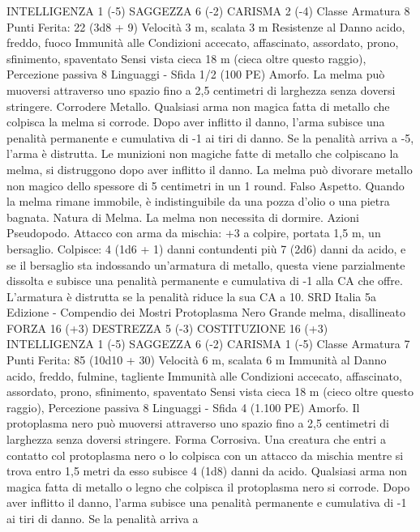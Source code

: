 \begin{multicols}{2}
INTELLIGENZA 1 (-5)
SAGGEZZA 6 (-2)
CARISMA 2 (-4)
Classe Armatura 8
\hspace*{0pt}\hfill{Punti Ferita}: 22 (3d8 + 9)
Velocità 3 m, scalata 3 m
Resistenze al Danno acido, freddo, fuoco
Immunità alle Condizioni accecato, affascinato, assordato,
prono, sfinimento, spaventato
Sensi vista cieca 18 m (cieca oltre questo raggio), Percezione
passiva 8
Linguaggi -
Sfida 1/2 (100 PE)
Amorfo. La melma può muoversi attraverso uno spazio fino a 2,5
centimetri di larghezza senza doversi stringere.
Corrodere Metallo. Qualsiasi arma non magica fatta di metallo che
colpisca la melma si corrode. Dopo aver inflitto il danno, l’arma
subisce una penalità permanente e cumulativa di -1 ai tiri di danno.
Se la penalità arriva a -5, l’arma è distrutta. Le munizioni non
magiche fatte di metallo che colpiscano la melma, si distruggono
dopo aver inflitto il danno.
La melma può divorare metallo non magico dello spessore di 5
centimetri in un 1 round.
Falso Aspetto. Quando la melma rimane immobile, è
indistinguibile da una pozza d’olio o una pietra bagnata.
Natura di Melma. La melma non necessita di dormire.
Azioni
Pseudopodo. Attacco con arma da mischia: +3 a colpire, portata
1,5 m, un bersaglio.
Colpisce: 4 (1d6 + 1) danni contundenti più 7 (2d6) danni da
acido, e se il bersaglio sta indossando un’armatura di metallo,
questa viene parzialmente dissolta e subisce una penalità
permanente e cumulativa di -1 alla CA che offre. L’armatura è
distrutta se la penalità riduce la sua CA a 10.
SRD Italia 5a Edizione - Compendio dei Mostri
Protoplasma Nero
Grande melma, disallineato
FORZA 16 (+3)
DESTREZZA 5 (-3)
COSTITUZIONE 16 (+3)
INTELLIGENZA 1 (-5)
SAGGEZZA 6 (-2)
CARISMA 1 (-5)
Classe Armatura 7
\hspace*{0pt}\hfill{Punti Ferita}: 85 (10d10 + 30)
Velocità 6 m, scalata 6 m
Immunità al Danno acido, freddo, fulmine, tagliente
Immunità alle Condizioni accecato, affascinato, assordato,
prono, sfinimento, spaventato
Sensi vista cieca 18 m (cieco oltre questo raggio), Percezione
passiva 8
Linguaggi -
Sfida 4 (1.100 PE)
Amorfo. Il protoplasma nero può muoversi attraverso uno spazio
fino a 2,5 centimetri di larghezza senza doversi stringere.
Forma Corrosiva. Una creatura che entri a contatto col protoplasma
nero o lo colpisca con un attacco da mischia mentre si trova entro 1,5
metri da esso subisce 4 (1d8) danni da acido. Qualsiasi arma non
magica fatta di metallo o legno che colpisca il protoplasma nero si
corrode. Dopo aver inflitto il danno, l’arma subisce una penalità
permanente e cumulativa di -1 ai tiri di danno. Se la penalità arriva a

\end{multicols}
